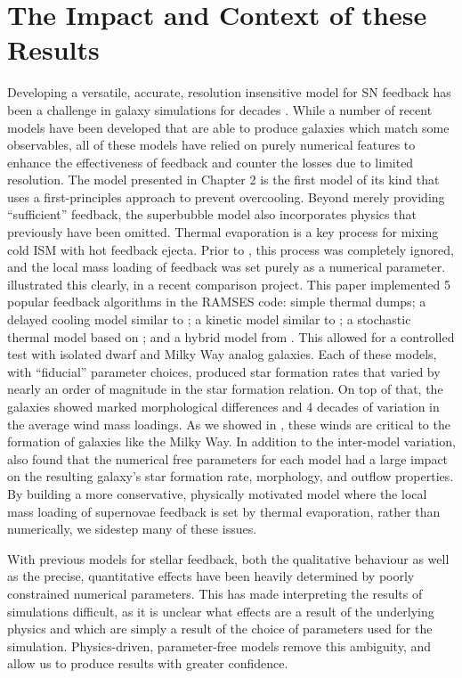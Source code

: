 \section{The Impact and Context of these Results}
Developing a versatile, accurate, resolution insensitive model for SN feedback
has been a challenge in galaxy simulations for decades \citep{Katz1992}.  While
a number of recent models have been developed that are able to produce galaxies
which match some observables, all of these models have relied on purely
numerical features to enhance the effectiveness of feedback and counter the
losses due to limited resolution.  The \citet{Keller2014} model presented in
Chapter 2 is the first model of its kind that uses a first-principles approach
to prevent overcooling.  Beyond merely providing ``sufficient'' feedback, the
superbubble model also incorporates physics that previously have been omitted.
Thermal evaporation is a key process for mixing cold ISM with hot feedback
ejecta.  Prior to \citet{Keller2014}, this process was completely ignored, and
the local mass loading of feedback was set purely as a numerical parameter.
\citet{Rosdahl2016} illustrated this clearly, in a recent comparison project.
This paper implemented 5 popular feedback algorithms in the {\sc RAMSES} code:
simple thermal dumps; a delayed cooling model similar to \citet{Agertz2013}; a
kinetic model similar to \citet{DallaVecchia2008}; a stochastic thermal model
based on \citet{DallaVecchia2012}; and a hybrid model from \citet{Kimm2015}.
This allowed for a controlled test with isolated dwarf and Milky Way analog
galaxies. Each of these models, with ``fiducial'' parameter choices, produced
star formation rates that varied by nearly an order of magnitude in the
\citet{Kennicutt1998} star formation relation.  On top of that, the galaxies
showed marked morphological differences and 4 decades of variation in the
average wind mass loadings.  As we showed in \citet{Keller2015}, these winds are
critical to the formation of galaxies like the Milky Way.  In addition to the
inter-model variation, \citet{Rosdahl2016} also found that the numerical free
parameters for each model had a large impact on the resulting galaxy's star
formation rate, morphology, and outflow properties.  By building a more
conservative, physically motivated model where the local mass loading of
supernovae feedback is set by thermal evaporation, rather than numerically, we
sidestep many of these issues.

With previous models for stellar feedback, both the qualitative behaviour as
well as the precise, quantitative effects have been heavily determined by
poorly constrained numerical parameters.  This has made interpreting the results
of simulations difficult, as it is unclear what effects are a result of
the underlying physics and which are simply a result of the choice of parameters
used for the simulation.  Physics-driven, parameter-free models remove this
ambiguity, and allow us to produce results with greater confidence.  

